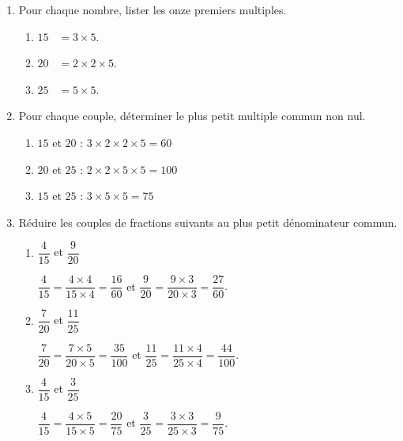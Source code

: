 \begin{corrige}
    \begin{enumerate}
        \item Pour chaque nombre, lister les onze premiers multiples.
        
            \begin{enumerate}
                \item $15$ ~{\red $= 3\times 5$.}
                \item $20$ ~{\red $= 2\times 2\times 5$.}
                \item $25$ ~{\red $= 5\times 5$.}
            \end{enumerate}  
        \setcounter{enumi}{1}
        \item Pour chaque couple, déterminer le plus petit multiple commun non nul.

            \begin{enumerate}
                \item $15$ et $20$ {\red : $3\times 2\times2 \times5 = 60$}
                \item $20$ et $25$ {\red : $2\times 2\times 5\times 5 = 100$}
                \item $15$ et $25$ {\red : $3\times 5\times 5 = 75$}
            \end{enumerate}           
        \setcounter{enumi}{2}
        \item Réduire les couples de fractions suivants au plus petit dénominateur commun.
        
            \begin{spacing}{2}
                \begin{enumerate}
                    \item $\dfrac{4}{15}$ et $\dfrac{9}{20}$   
                    
                    {\red $\dfrac{4}{15}=\dfrac{4\times4}{15\times4}=\dfrac{16}{60}$ et $\dfrac{9}{20}=\dfrac{9\times3}{20\times3}=\dfrac{27}{60}$}.
                    \item $\dfrac{7}{20}$ et $\dfrac{11}{25}$ 
                    
                    {\red $\dfrac{7}{20}=\dfrac{7\times5}{20\times5}=\dfrac{35}{100}$ et $\dfrac{11}{25}=\dfrac{11\times4}{25\times4}=\dfrac{44}{100}$}.
                    \item $\dfrac{4}{15}$ et $\dfrac{3}{25}$ 
                    
                    {\red $\dfrac{4}{15}=\dfrac{4\times5}{15\times5}=\dfrac{20}{75}$ et $\dfrac{3}{25}=\dfrac{3\times3}{25\times3}=\dfrac{9}{75}$}.
                \end{enumerate}
            \end{spacing}
    \end{enumerate}
\end{corrige}

